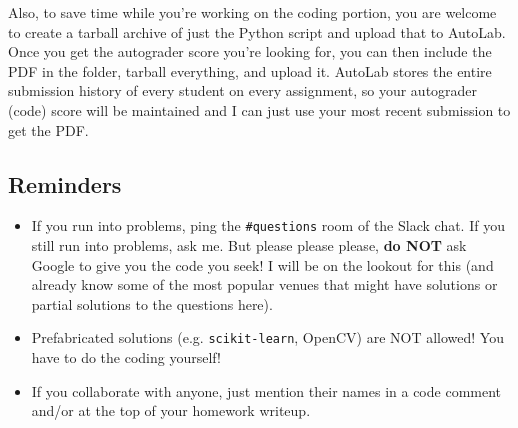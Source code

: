 \documentclass[paper=a4, fontsize=11pt]{scrartcl} %
\numberwithin{figure}{section} %
\numberwithin{table}{section} %
\begin{document}
Also, to save time while you're working on the coding portion, you are welcome to create a tarball archive of just the Python script and upload that to AutoLab. Once you get the autograder score you're looking for, you can then include the PDF in the folder, tarball everything, and upload it. AutoLab stores the entire submission history of every student on every assignment, so your autograder (code) score will be maintained and I can just use your most recent submission to get the PDF.

\subsection{Reminders}

\begin{itemize}
	\item If you run into problems, ping the \texttt{\#questions} room of the Slack chat. If you still run into problems, ask me. But please please please, \textbf{do NOT} ask Google to give you the code you seek! I will be on the lookout for this (and already know some of the most popular venues that might have solutions or partial solutions to the questions here).
	\item Prefabricated solutions (e.g. \texttt{scikit-learn}, OpenCV) are NOT allowed! You have to do the coding yourself!
	\item If you collaborate with anyone, just mention their names in a code comment and/or at the top of your homework writeup.
\end{itemize}
\end{document}
